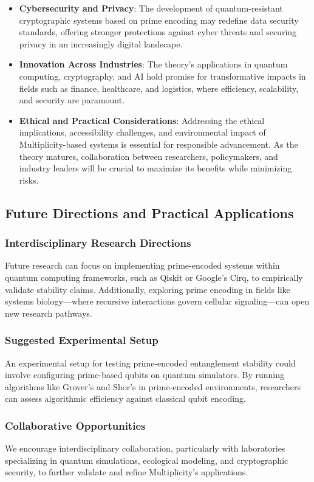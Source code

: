 \documentclass{article}
\theoremstyle{plain}
\begin{document}
\begin{itemize}
    \item \textbf{Cybersecurity and Privacy}: The development of quantum-resistant cryptographic systems based on prime encoding may redefine data security standards, offering stronger protections against cyber threats and securing privacy in an increasingly digital landscape.
    
    \item \textbf{Innovation Across Industries}: The theory’s applications in quantum computing, cryptography, and AI hold promise for transformative impacts in fields such as finance, healthcare, and logistics, where efficiency, scalability, and security are paramount.
    
    \item \textbf{Ethical and Practical Considerations}: Addressing the ethical implications, accessibility challenges, and environmental impact of Multiplicity-based systems is essential for responsible advancement. As the theory matures, collaboration between researchers, policymakers, and industry leaders will be crucial to maximize its benefits while minimizing risks.
\end{itemize}

\subsection{Future Directions and Practical Applications}
\subsubsection{Interdisciplinary Research Directions}
Future research can focus on implementing prime-encoded systems within quantum computing frameworks, such as Qiskit or Google’s Cirq, to empirically validate stability claims. Additionally, exploring prime encoding in fields like systems biology—where recursive interactions govern cellular signaling—can open new research pathways.

\subsubsection{Suggested Experimental Setup}
An experimental setup for testing prime-encoded entanglement stability could involve configuring prime-based qubits on quantum simulators. By running algorithms like Grover’s and Shor’s in prime-encoded environments, researchers can assess algorithmic efficiency against classical qubit encoding.

\subsubsection{Collaborative Opportunities}
We encourage interdisciplinary collaboration, particularly with laboratories specializing in quantum simulations, ecological modeling, and cryptographic security, to further validate and refine Multiplicity's applications. 
\nolinenumbers

\nocite{*}


\end{document}

